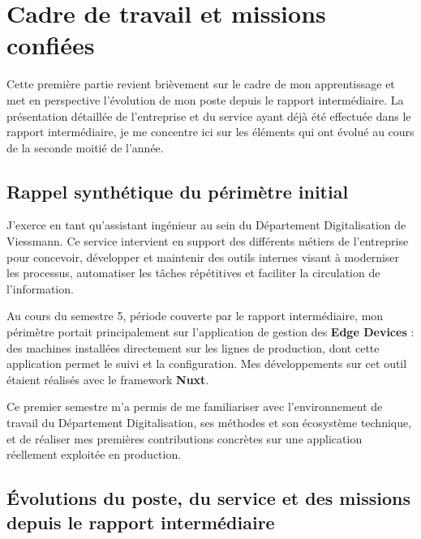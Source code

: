 \documentclass[pe1a]{tnreport} %
\begin{document}



\cleardoublepage
\chapter{Cadre de travail et missions confiées}

Cette première partie revient brièvement sur le cadre de mon apprentissage et 
met en perspective l'évolution de mon poste depuis le rapport intermédiaire. 
La présentation détaillée de l'entreprise et du service ayant déjà été 
effectuée dans le rapport intermédiaire, je me concentre ici sur les éléments qui ont 
évolué au cours de la seconde moitié de l'année.

\section{Rappel synthétique du périmètre initial}

J'exerce en tant qu'assistant ingénieur au sein du Département Digitalisation 
de Viessmann. Ce service intervient en support des différents métiers de 
l'entreprise pour concevoir, développer et maintenir des outils internes 
visant à moderniser les processus, automatiser les tâches répétitives et 
faciliter la circulation de l'information.

Au cours du semestre 5, période couverte par le rapport intermédiaire, mon 
périmètre portait principalement sur l'application de gestion des 
\textbf{Edge Devices} : des machines installées directement sur les lignes 
de production, dont cette application permet le suivi et la configuration. 
Mes développements sur cet outil étaient réalisés avec le framework 
\textbf{Nuxt}.

Ce premier semestre m'a permis de me familiariser avec l'environnement de 
travail du Département Digitalisation, ses méthodes et son écosystème 
technique, et de réaliser mes premières contributions concrètes sur une 
application réellement exploitée en production.

\section{Évolutions du poste, du service et des missions depuis le rapport intermédiaire}
\end{document}
